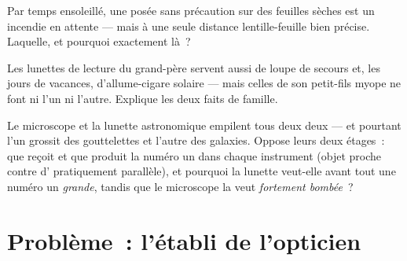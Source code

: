 \begin{exercise}[$\star\star$]\label{exo:g8:lenses-images:10}
Par temps ensoleillé, une  posée sans précaution sur des
feuilles sèches est un incendie en attente --- mais à une seule
distance lentille-feuille bien précise. Laquelle, et pourquoi
exactement là~?
\end{exercise}

\begin{exercise}[$\star\star$]\label{exo:g8:lenses-images:11}
Les lunettes de lecture du grand-père servent aussi de loupe de
secours et, les jours de vacances, d'allume-cigare solaire --- mais
celles de son petit-fils myope ne font ni l'un ni l'autre. Explique
les deux faits de famille.
\end{exercise}

\begin{exercise}[$\star\star\star$]\label{exo:g8:lenses-images:12}
Le microscope et la lunette astronomique empilent tous deux deux
 --- et pourtant l'un grossit des gouttelettes
et l'autre des galaxies. Oppose leurs deux étages~: que reçoit et que
produit la  numéro un dans chaque instrument (objet proche
contre  d' pratiquement parallèle), et pourquoi la
lunette veut-elle avant tout une  numéro un \emph{grande},
tandis que le microscope la veut \emph{fortement bombée}~?
\end{exercise}

\section{Problème~: l'établi de l'opticien}

